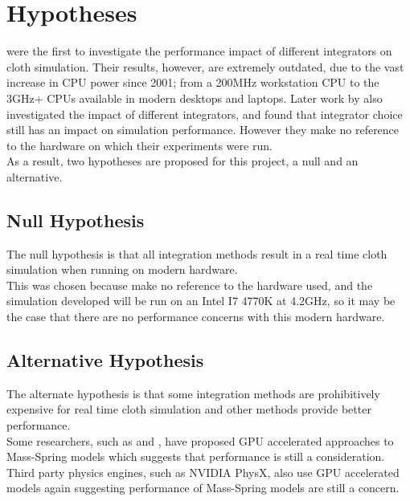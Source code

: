 \section{Hypotheses}
\textcite{Volino2001} were the first to investigate the performance impact of different integrators on cloth simulation. Their results, however, are extremely outdated, due to the vast increase in CPU power since 2001; from a 200MHz workstation CPU to the 3GHz+ CPUs available in modern desktops and laptops. Later work by \textcite{Wang2009a} also investigated the impact of different integrators, and found that integrator choice still has an impact on simulation performance. However they make no reference to the hardware on which their experiments were run.
\\As a result, two hypotheses are proposed for this project, a null and an alternative.

\subsection{Null Hypothesis}
The null hypothesis is that all integration methods result in a real time cloth simulation when running on modern hardware.
\\This was chosen because \textcite{Wang2009a} make no reference to the hardware used, and the simulation developed will be run on an Intel I7 4770K at 4.2GHz, so it may be the case that there are no performance concerns with this modern hardware.

\subsection{Alternative Hypothesis}
The alternate hypothesis is that some integration methods are prohibitively expensive for real time cloth simulation and other methods provide better performance.
\\Some researchers, such as \textcite{Zeller2005} and \textcite{Tang2013}, have proposed GPU accelerated approaches to Mass-Spring models which suggests that performance is still a consideration. Third party physics engines, such as NVIDIA \textsuperscript{\textregistered} PhysX\textsuperscript{\textregistered}, also use GPU accelerated models \parencite{Kim2011} again suggesting performance of Mass-Spring models are still a concern.

